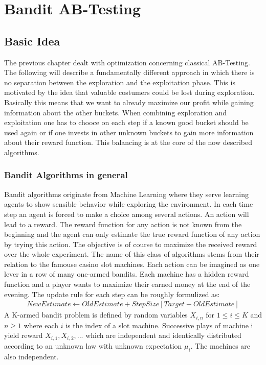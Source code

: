 \documentclass[main.tex]{subfiles}
\begin{document}
\chapter{Bandit AB-Testing}
\section{Basic Idea}
The previous chapter dealt with optimization concerning classical AB-Testing. The following will describe a fundamentally different approach in which there is no separation between the exploration and the exploitation phase. This is motivated by the idea that valuable costumers could be lost during exploration. Basically this means that we want to already maximize our profit while gaining information about the other buckets. When combining exploration and exploitation one has to chooce on each step if a known good bucket should be used again or if one invests in other unknown buckets to gain more information about their reward function. This balancing is at the core of the now described algorithms.

\subsection{Bandit Algorithms in general}
Bandit algorithms originate from Machine Learning where they serve learning agents to show sensible behavior while exploring the environment. In each time step an agent is forced to make a choice among several actions. An action will lead to a reward. The reward function for any action is not known from the beginning and the agent can only estimate the true reward function of any action by trying this action. The objective is of course to maximize the received reward over the whole experiment. The name of this class of algorithms stems from their relation to the famouse casino slot machines. Each action can be imagined as one lever in a row of many one-armed bandits. Each machine has a hidden reward function and a player wants to maximize their earned money at the end of the evening. The update rule for each step can be roughly formulized as:
\begin{align*}
NewEstimate \leftarrow OldEstimate + StepSize[Target - OldEstimate]
\end{align*}
A K-armed bandit problem is defined by random variables $X_{i,n}$ for $1 \leq i \leq K$ and $n\geq1$ where each $i$ is the index of a slot machine. Successive plays of machine i yield reward $X_{i,1},X_{i,2},...$ which are independent and identically distributed according to an unknown law with unknown expectation $\mu_i$. The machines are also independent.
\end{document}
